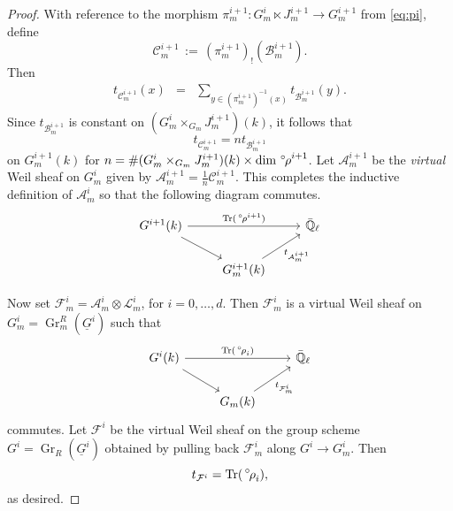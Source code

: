 \documentclass[10pt]{amsart}
\theoremstyle{plain}
\theoremstyle{definition}
\newcommand{\EE}{\mathbb{\bar Q}_\ell}
\newcommand{\Fq}{k}
\DeclareMathOperator{\Gr}{Gr}
\DeclareMathOperator{\trace}{Tr}
\newcommand{\ceq}{{\, :=\, }}
\newcommand{\trFrob}[1]{t_{#1}}
\newcommand{\cs}[1]{{\mathcal{#1}}}
\newcommand{\orho}{{\,^\circ \hskip-1pt \rho}}
\begin{document}
\begin{proof}
With reference to the morphism $\pi_m^{i+1} : G_m^i \ltimes J_m^{i+1} \to G_m^{i+1}$ from \eqref{eq:pi}, define 
\[
\cs{C}_m^{i+1} \ceq (\pi_m^{i+1})_! (\cs{B}_m^{i+1}).
\]
Then
\begin{eqnarray*}
\trFrob{\cs{C}^{i+1}_m}(x)
&=& \sum_{y\in (\pi_m^{i+1})^{-1}(x)}  \trFrob{\cs{B}_m^{i+1}}(y).
\end{eqnarray*}
Since $\trFrob{\cs{B}^{i+1}_m}$ is constant on $(G_m^{i}\times_{G_m} J_m^{i+1})(\Fq)$, it follows that 
\[
\trFrob{\cs{C}^{i+1}_m} = n \trFrob{\cs{B}^{i+1}_m}
\]
on $G_m^{i+1}(\Fq)$ for $n = \# (G_m^{i}\times_{G_m} J_m^{i+1})(\Fq) \times \dim \orho^{i+1} $.
Let $\cs{A}_m^{i+1}$ be the \emph{virtual} Weil sheaf on $G_m^i$ given by $\cs{A}_m^{i+1} = \frac{1}{n} \cs{C}_m^{i+1}$. 
%
This completes the inductive definition of $\cs{A}_m^i$ so that the following diagram commutes.
\[
\begin{tikzcd}
G^{i+1}(\Fq) \arrow{rr}{\trace(\orho^{i+1})} \arrow{rd} && \EE\\
& G_m^{i+1}(\Fq)\arrow{ru}[swap]{{\trFrob{\cs{A}_m^{i+1}}} } & 
\end{tikzcd}
\]

Now set $\cs{F}^i_m = \cs{A}_m^{i} \otimes \cs{L}_m^i$, for $i=0, \ldots ,d$.
Then $\cs{F}^i_m$ is a virtual Weil sheaf on $G^i_m = \Gr^{R}_m(\underline{G}^i)$ such that
\[
\begin{tikzcd}
G^i(\Fq) \arrow{rr}{\trace(\orho_i)} \arrow{rd} && \EE\\
& G_m(\Fq) \arrow{ru}[swap]{\trFrob{\cs{F}^i_m}} & 
\end{tikzcd}
\]
commutes.
Let $\cs{F}^i$ be the virtual Weil sheaf on the group scheme $G^i= \Gr_{R}(\underline{G}^i)$ obtained by pulling back $\cs{F}_m^i$ along $G^i \to G^i_m$.
Then 
\[
\trFrob{\cs{F}^i} = \trace(\orho_i),
\] 
as desired.
\end{proof}

%
\end{document}
